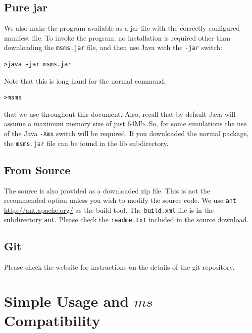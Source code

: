 \documentclass{article}
\begin{document}
\subsection{Pure jar}

We also make the program available as a jar file with the correctly configured
manifest file. To invoke the program, no installation is required other than
downloading the {\tt msms.jar} file, and then use Java with the {\tt -jar}
switch:
\begin{verbatim}
>java -jar msms.jar
\end{verbatim}
Note that this is long hand for the normal command,
\begin{verbatim}
>msms
\end{verbatim}
that we use throughout this document. Also, recall that by default Java will assume
a maximum memory size of just 64Mb. So, for some simulations the use of the
Java {\tt -Xmx} switch will be required. If you downloaded the normal package,
the {\tt msms.jar} file can be found in the lib subdirectory. 

\subsection{From Source}
The source is also provided as a downloaded zip file. This is not the
recommended option unless you wish to modify the source code. We use {\tt ant}
\url{http://ant.apache.org/} as the build tool. The {\tt build.xml} file is in
the subdirectory {\tt ant}. Please check the {\tt readme.txt} included in the
source download.

\subsection{Git}
Please check the website for instructions on the details of the git
repository.  

\section{Simple Usage and $ms$ Compatibility}
\end{document}
